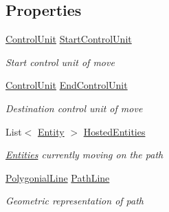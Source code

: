 \subsection*{Properties}
\begin{DoxyCompactItemize}
\item 
\hyperlink{class_simulation_core_1_1_h_c_c_m_elements_1_1_control_unit}{Control\+Unit} \hyperlink{class_general_health_care_elements_1_1_entities_1_1_entity_path_af4331d4301dd4f639971b27e91d53f3b}{Start\+Control\+Unit}
\begin{DoxyCompactList}\small\item\em Start control unit of move \end{DoxyCompactList}\item 
\hyperlink{class_simulation_core_1_1_h_c_c_m_elements_1_1_control_unit}{Control\+Unit} \hyperlink{class_general_health_care_elements_1_1_entities_1_1_entity_path_aed9943faa43bed13e3ad3314fd509d37}{End\+Control\+Unit}
\begin{DoxyCompactList}\small\item\em Destination control unit of move \end{DoxyCompactList}\item 
List$<$ \hyperlink{class_simulation_core_1_1_h_c_c_m_elements_1_1_entity}{Entity} $>$ \hyperlink{class_general_health_care_elements_1_1_entities_1_1_entity_path_a85f4fd8f52bbd223fad8e83cb1532ff7}{Hosted\+Entities}
\begin{DoxyCompactList}\small\item\em \hyperlink{namespace_general_health_care_elements_1_1_entities}{Entities} currently moving on the path \end{DoxyCompactList}\item 
\hyperlink{class_simulation_core_1_1_math_tool_1_1_geometric_classes_1_1_polygonial_line}{Polygonial\+Line} \hyperlink{class_general_health_care_elements_1_1_entities_1_1_entity_path_a2c43f7ce39c27c4c4f7a613bbbfb8acd}{Path\+Line}
\begin{DoxyCompactList}\small\item\em Geometric representation of path \end{DoxyCompactList}\end{DoxyCompactItemize}


